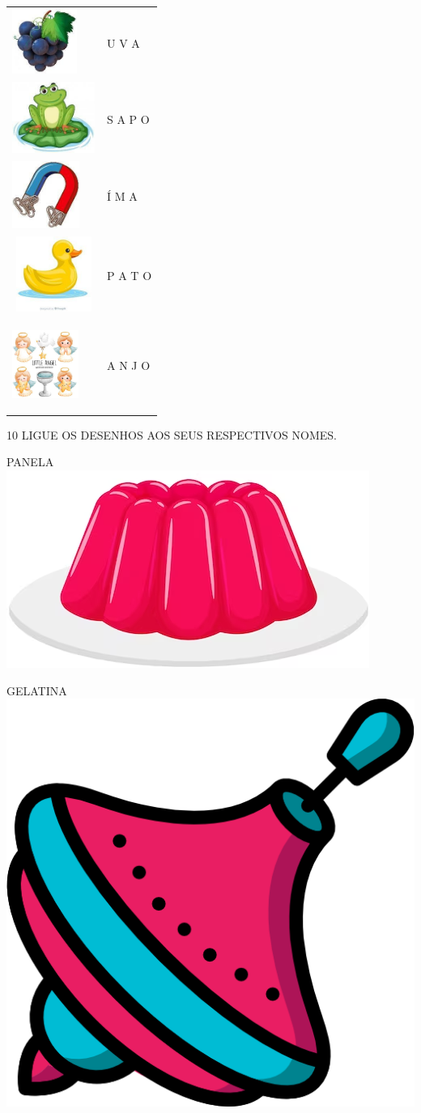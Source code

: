 \begin{tabular}{ll}
\includegraphics[width=0.83333in,height=0.84004in]{media/image38.jpg} & U V A \\
\includegraphics[width=1.06463in,height=0.91667in]{media/image39.jpg} & S A P O \\
\includegraphics[width=0.86458in,height=0.86667in]{media/image40.jpg} & Í M A \\
\includegraphics[width=1.07292in,height=0.97005in]{media/image41.jpg} & P A  T O \\
\includegraphics[width=0.85417in,height=1.14167in]{media/image42.jpg} & A N J O
\end{tabular}

\pagebreak
\num{10} LIGUE OS DESENHOS AOS SEUS RESPECTIVOS NOMES.

PANELA \hfill\includegraphics[width=.2\textwidth]{media/image43.png}

GELATINA \hfill\includegraphics[width=.15\textwidth]{media/image44.png}

